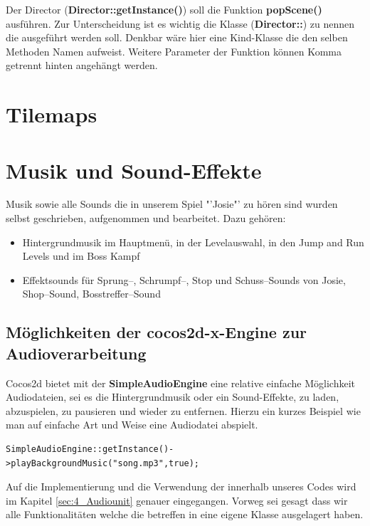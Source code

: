 Der Director (\textbf{Director::getInstance()}) soll die Funktion \textbf{popScene()} ausführen. Zur Unterscheidung ist es wichtig die Klasse (\textbf{Director::}) zu nennen die ausgeführt werden soll. Denkbar wäre hier eine Kind-Klasse die den selben Methoden Namen aufweist. 
Weitere Parameter der Funktion können Komma getrennt hinten angehängt werden.



\section{Tilemaps}\label{sec:2_Tilemaps}



\section{Musik und Sound-Effekte}\label{sec:2_Musik}
Musik sowie alle Sounds die in unserem Spiel "'Josie"' zu hören sind wurden selbst geschrieben, aufgenommen und bearbeitet. Dazu gehören:

\begin{itemize}
\item Hintergrundmusik im Hauptmenü, in der Levelauswahl, in den Jump and Run Levels und im Boss Kampf
\item Effektsounds für Sprung--, Schrumpf--, Stop und Schuss--Sounds von Josie, Shop--Sound, Bosstreffer--Sound
\end{itemize}

\subsection{Möglichkeiten der cocos2d-x-Engine zur Audioverarbeitung}
Cocos2d bietet mit der \textbf{SimpleAudioEngine} eine relative einfache Möglichkeit Audio\-dateien, sei es die Hintergrundmusik oder ein Sound-Effekte, zu laden, abzuspielen, zu pausieren und wieder zu entfernen. Hierzu ein kurzes Beispiel wie man auf einfache Art und Weise eine Audiodatei abspielt.

\begin{lstlisting}[style=singleline]
SimpleAudioEngine::getInstance()->playBackgroundMusic("song.mp3",true);
\end{lstlisting}

Auf die Implementierung und die Verwendung der  innerhalb unseres Codes wird im Kapitel \ref{sec:4_Audiounit} genauer eingegangen. Vorweg sei gesagt dass wir alle Funktionalitäten welche die  betreffen in eine eigene Klasse  ausgelagert haben.


